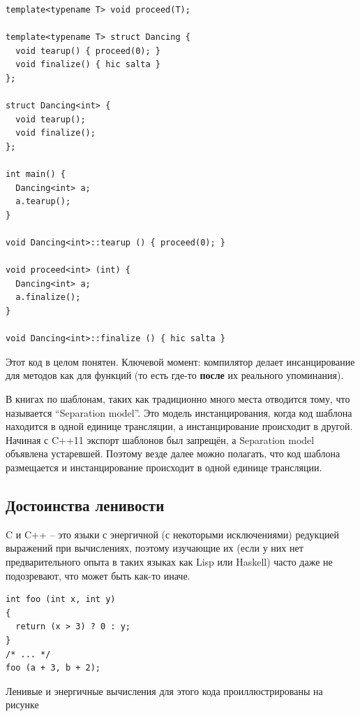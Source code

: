 \documentclass[a4paper,12pt,oneside]{book}
\begin{document}
\begin{lstlisting}
template<typename T> void proceed(T);

template<typename T> struct Dancing {
  void tearup() { proceed(0); }
  void finalize() { hic salta }
};

struct Dancing<int> {
  void tearup();
  void finalize();
};

int main() {
  Dancing<int> a;
  a.tearup();
}

void Dancing<int>::tearup () { proceed(0); }

void proceed<int> (int) { 
  Dancing<int> a; 
  a.finalize(); 
}

void Dancing<int>::finalize () { hic salta }
\end{lstlisting}

Этот код в целом понятен. Ключевой момент: компилятор делает инсанцирование для методов как для функций (то есть где-то \textbf{после} их реального упоминания).

В книгах по шаблонам, таких как \cite{vandervoord} традиционно много места отводится тому, что называется ``Separation model''. Это модель инстанцирования, когда код шаблона находится в одной единице трансляции, а инстанцирование происходит в другой. Начиная с C++11 экспорт шаблонов был запрещён, а Separation model объявлена устаревшей. Поэтому везде далее можно полагать, что код шаблона размещается и инстанцирование происходит в одной единице трансляции.

\pagebreak
\subsection{Достоинства ленивости}\label{Lazyness}

C и C++ -- это языки с энергичной (с некоторыми исключениями) редукцией выражений при вычислениях, поэтому изучающие их (если у них нет предварительного опыта в таких языках как Lisp или Haskell) часто даже не подозревают, что может быть как-то иначе.

\begin{lstlisting}
int foo (int x, int y)
{
  return (x > 3) ? 0 : y;
}
/* ... */
foo (a + 3, b + 2);
\end{lstlisting}

Ленивые и энергичные вычисления для этого кода проиллюстрированы на рисунке
\end{document}
